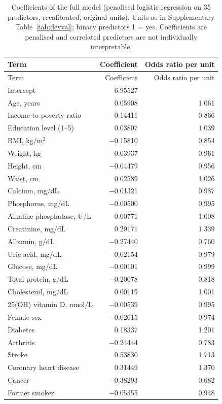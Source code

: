 \documentclass[11pt,a4paper]{article}
\begin{document}
\begin{longtable}{lrr}
\caption{Coefficients of the full model (penalised logistic regression on 35 predictors, recalibrated, original units). Units as in Supplementary Table~\ref{tab:devval}; binary predictors 1 = yes. Coefficients are penalised and correlated predictors are not individually interpretable.}\label{tab:coef}\\
\toprule
Term & Coefficient & Odds ratio per unit \\
\midrule
\endfirsthead
\toprule
Term & Coefficient & Odds ratio per unit \\
\midrule
\endhead
\bottomrule
\endfoot
Intercept & 6.95527 &  \\
Age, years & 0.05908 & 1.061 \\
Income-to-poverty ratio & $-$0.14411 & 0.866 \\
Education level (1--5) & 0.03807 & 1.039 \\
BMI, kg/m$^2$ & $-$0.15810 & 0.854 \\
Weight, kg & $-$0.03937 & 0.961 \\
Height, cm & $-$0.04479 & 0.956 \\
Waist, cm & 0.02589 & 1.026 \\
Calcium, mg/dL & $-$0.01321 & 0.987 \\
Phosphorus, mg/dL & $-$0.00500 & 0.995 \\
Alkaline phosphatase, U/L & 0.00771 & 1.008 \\
Creatinine, mg/dL & 0.29171 & 1.339 \\
Albumin, g/dL & $-$0.27440 & 0.760 \\
Uric acid, mg/dL & $-$0.02154 & 0.979 \\
Glucose, mg/dL & $-$0.00101 & 0.999 \\
Total protein, g/dL & $-$0.20078 & 0.818 \\
Cholesterol, mg/dL & 0.00119 & 1.001 \\
25(OH) vitamin D, nmol/L & $-$0.00539 & 0.995 \\
Female sex & $-$0.02615 & 0.974 \\
Diabetes & 0.18337 & 1.201 \\
Arthritis & $-$0.24444 & 0.783 \\
Stroke & 0.53830 & 1.713 \\
Coronary heart disease & 0.31449 & 1.370 \\
Cancer & $-$0.38293 & 0.682 \\
Former smoker & $-$0.05355 & 0.948 \\

\end{longtable}
\end{document}
